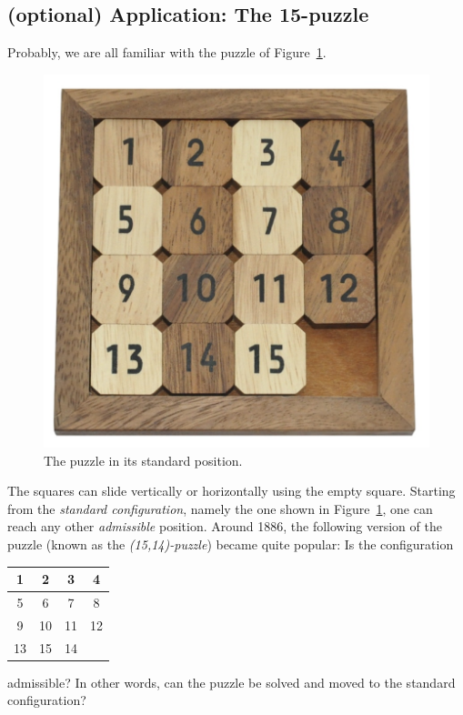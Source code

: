 \subsection{(optional) Application: The 15-puzzle}

Probably, we are all familiar with the puzzle of Figure~\ref{fig:toy}. 

\begin{figure}[ht]
    \centering
    \includegraphics[width=0.25\linewidth]{images/15puzzle.jpg}
    \caption{The puzzle in its standard position.}
    \label{fig:toy}
\end{figure}


The squares can slide vertically or horizontally using the empty square. Starting from the \emph{standard configuration}, 
namely the one shown in Figure~\ref{fig:toy}, one can reach any other \emph{admissible} position.
Around 1886, the following version of the puzzle (known as the \emph{(15,14)-puzzle}) 
became quite popular: Is the configuration 
\bigskip 
    \begin{center}
        \begin{tabular}{|c|c|c|c|}
            \hline
            1 & 2 & 3 & 4\\
            \hline
            5 & 6 & 7 & 8\\
            \hline
            9 & 10 & 11 & 12\\
            \hline
            13 & 15 & 14 & \\
            \hline
        \end{tabular}
    \end{center}
\bigskip 
admissible? In other words, can the puzzle be solved and moved to the standard configuration? 


